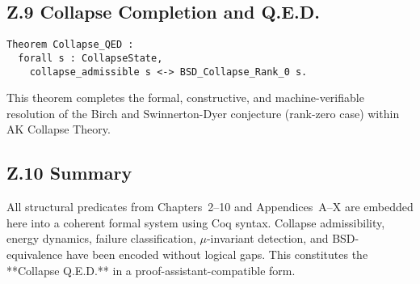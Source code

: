 \documentclass[11pt]{article}
\begin{document}
\subsection*{Z.9 Collapse Completion and Q.E.D.}

\begin{lstlisting}[language=Coq]
Theorem Collapse_QED :
  forall s : CollapseState,
    collapse_admissible s <-> BSD_Collapse_Rank_0 s.
\end{lstlisting}

This theorem completes the formal, constructive, and machine-verifiable resolution of the Birch and Swinnerton-Dyer conjecture (rank-zero case) within AK Collapse Theory.

\subsection*{Z.10 Summary}

All structural predicates from Chapters~2–10 and Appendices~A–X are embedded here into a coherent formal system using Coq syntax. Collapse admissibility, energy dynamics, failure classification, \(\mu\)-invariant detection, and BSD-equivalence have been encoded without logical gaps. This constitutes the **Collapse Q.E.D.** in a proof-assistant-compatible form.
\end{document}
